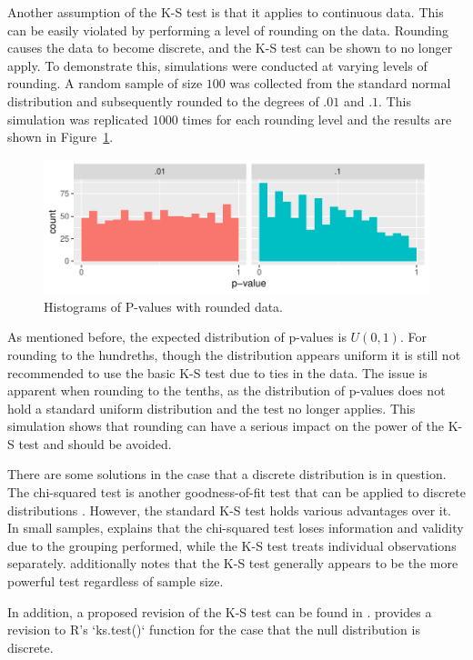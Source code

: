 \documentclass[12pt, letterpaper, titlepage]{article}
\begin{document}
Another assumption of the K-S test is that it applies to continuous data. This can be easily violated by performing a level of rounding on the data. Rounding causes the data to become discrete, and the K-S test can be shown to no longer apply. To demonstrate this, simulations were conducted at varying levels of rounding. A random sample of size $100$ was collected from the standard normal distribution and subsequently rounded to the degrees of $.01$ and  $.1$. This simulation was replicated $1000$ times for each rounding level and the results are shown in Figure~\ref{fig:hist_rounded}.

\begin{figure}[tbp]
  \centering
  \includegraphics{hist_rounded}
  \caption{Histograms of P-values with rounded data.}
  \label{fig:hist_rounded}
\end{figure}

As mentioned before, the expected distribution of p-values is $U(0,1)$. For rounding to the hundreths, though the distribution appears uniform it is still not recommended to use the basic K-S test due to ties in the data. The issue is apparent when rounding to the tenths, as the distribution of p-values does not hold a standard uniform distribution and the test no longer applies. This simulation shows that rounding can have a serious impact on the power of the K-S test and should be avoided.

There are some solutions in the case that a discrete distribution is in question. The chi-squared test is another goodness-of-fit test that can be applied to discrete distributions \citep{Massey}. However, the standard K-S test holds various advantages over it. In small samples, \citet{Massey} explains that the chi-squared test loses information and validity due to the grouping performed, while the K-S test treats individual observations separately. \citet{Massey} additionally notes that the K-S test generally appears to be the more powerful test regardless of sample size.

In addition, a proposed revision of the K-S test can be found in \citet{dgof}.\citet{dgof} provides a revision to R's `ks.test()` function for the case that the null distribution is discrete.
\end{document}
